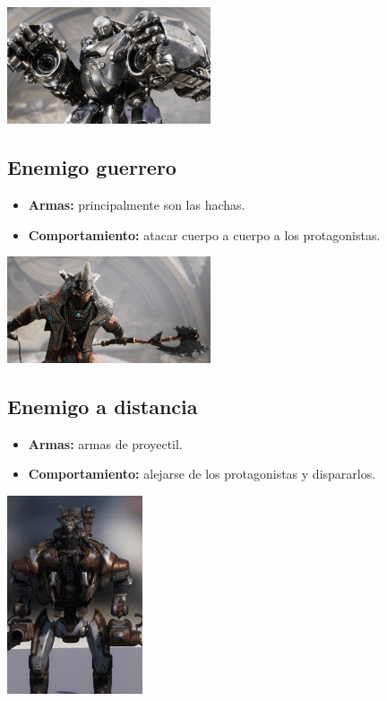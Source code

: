 \documentclass[twoside]{article}
\begin{document}
\begin{center}
\includegraphics[width=6cm]{./images/shiva.jpg}
\end{center}

\subsection{Enemigo guerrero}
\begin{itemize}
\item \textbf{Armas:} principalmente son las hachas.
\item \textbf{Comportamiento:} atacar cuerpo a cuerpo a los protagonistas.
\end{itemize}

\begin{center}
\includegraphics[width=6cm]{./images/guerrero.jpg}
\end{center}

\subsection{Enemigo a distancia}
\begin{itemize}
\item \textbf{Armas:} armas de proyectil.
\item \textbf{Comportamiento:} alejarse de los protagonistas y dispararlos.
\end{itemize}

\begin{center}
\includegraphics[width=4cm]{./images/distancia.jpg}
\end{center}
\end{document}
